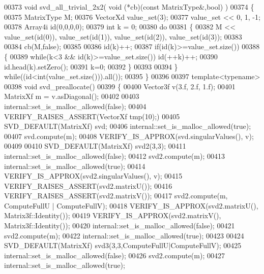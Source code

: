 \begin{DoxyCode}
00373 \textcolor{keywordtype}{void} svd\_all\_trivial\_2x2( \textcolor{keywordtype}{void} (*cb)(\textcolor{keyword}{const} MatrixType&,\textcolor{keywordtype}{bool}) )
00374 \{
00375   MatrixType M;
00376   VectorXd value\_set(3);
00377   value\_set << 0, 1, -1;
00378   Array4i id(0,0,0,0);
00379   \textcolor{keywordtype}{int} k = 0;
00380   \textcolor{keywordflow}{do}
00381   \{
00382     M << value\_set(\textcolor{keywordtype}{id}(0)), value\_set(\textcolor{keywordtype}{id}(1)), value\_set(\textcolor{keywordtype}{id}(2)), value\_set(\textcolor{keywordtype}{id}(3));
00383     
00384     cb(M,\textcolor{keyword}{false});
00385     
00386     id(k)++;
00387     \textcolor{keywordflow}{if}(\textcolor{keywordtype}{id}(k)>=value\_set.size())
00388     \{
00389       \textcolor{keywordflow}{while}(k<3 && \textcolor{keywordtype}{id}(k)>=value\_set.size()) \textcolor{keywordtype}{id}(++k)++;
00390       \textcolor{keywordtype}{id}.head(k).setZero();
00391       k=0;
00392     \}
00393     
00394   \} \textcolor{keywordflow}{while}((\textcolor{keywordtype}{id}<\textcolor{keywordtype}{int}(value\_set.size())).all());
00395 \}
00396 
00397 \textcolor{keyword}{template}<\textcolor{keyword}{typename}>
00398 \textcolor{keywordtype}{void} svd\_preallocate()
00399 \{
00400   Vector3f v(3.f, 2.f, 1.f);
00401   MatrixXf m = v.asDiagonal();
00402 
00403   internal::set\_is\_malloc\_allowed(\textcolor{keyword}{false});
00404   VERIFY\_RAISES\_ASSERT(VectorXf tmp(10);)
00405   SVD\_DEFAULT(MatrixXf) svd;
00406   internal::set\_is\_malloc\_allowed(\textcolor{keyword}{true});
00407   svd.compute(m);
00408   VERIFY\_IS\_APPROX(svd.singularValues(), v);
00409 
00410   SVD\_DEFAULT(MatrixXf) svd2(3,3);
00411   internal::set\_is\_malloc\_allowed(\textcolor{keyword}{false});
00412   svd2.compute(m);
00413   internal::set\_is\_malloc\_allowed(\textcolor{keyword}{true});
00414   VERIFY\_IS\_APPROX(svd2.singularValues(), v);
00415   VERIFY\_RAISES\_ASSERT(svd2.matrixU());
00416   VERIFY\_RAISES\_ASSERT(svd2.matrixV());
00417   svd2.compute(m, ComputeFullU | ComputeFullV);
00418   VERIFY\_IS\_APPROX(svd2.matrixU(), Matrix3f::Identity());
00419   VERIFY\_IS\_APPROX(svd2.matrixV(), Matrix3f::Identity());
00420   internal::set\_is\_malloc\_allowed(\textcolor{keyword}{false});
00421   svd2.compute(m);
00422   internal::set\_is\_malloc\_allowed(\textcolor{keyword}{true});
00423 
00424   SVD\_DEFAULT(MatrixXf) svd3(3,3,ComputeFullU|ComputeFullV);
00425   internal::set\_is\_malloc\_allowed(\textcolor{keyword}{false});
00426   svd2.compute(m);
00427   internal::set\_is\_malloc\_allowed(\textcolor{keyword}{true});

\end{DoxyCode}
